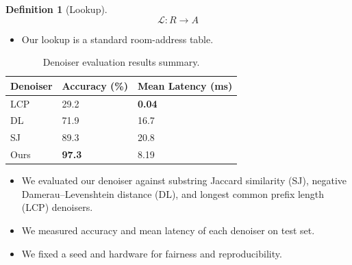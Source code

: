 \documentclass[aspectratio=169,notheorems,10pt]{beamer}
\theoremstyle{definition}
\newtheorem{definition}{Definition}
\begin{document}
\begin{frame}
\begin{definition}[Lookup]
$$
	\mathscr{L}:R\to A
$$
\end{definition}
\begin{itemize}
	\item Our lookup is a standard room-address table.
\end{itemize}
\end{frame}

\begin{frame}
\begin{table}[H]
	\centering
	\begin{tabular}{lll}
		\toprule
		\textbf{Denoiser} & \textbf{Accuracy} (\%) & \textbf{Mean Latency} (ms) \\
		\midrule
		LCP & 29.2 & \textbf{0.04} \\
		DL & 71.9 & 16.7 \\
		SJ & 89.3 & 20.8 \\
		Ours & \textbf{97.3} & 8.19 \\
		\bottomrule
	\end{tabular}
	\caption{Denoiser evaluation results summary.}
\end{table}
\begin{itemize}
	\item We evaluated our denoiser against substring Jaccard similarity (SJ), negative Damerau--Levenshtein distance (DL), and longest common prefix length (LCP) denoisers.
	\item We measured accuracy and mean latency of each denoiser on test set.
	\item We fixed a seed and hardware for fairness and reproducibility.
\end{itemize}
\end{frame}
\end{document}
